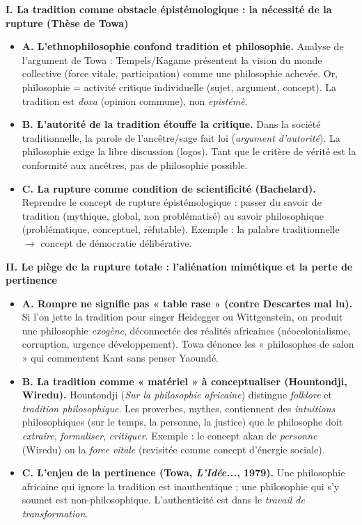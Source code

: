 \documentclass[11pt]{article}
\newcommand{\cle}[1]{{\popxbold\color{popdark}#1}}
\begin{document}
\begin{exoresolu}
\textbf{I. La tradition comme obstacle épistémologique : la nécessité de la rupture (Thèse de Towa)}
\begin{itemize}
    \item \textbf{A. L'ethnophilosophie confond tradition et philosophie.} Analyse de l'argument de Towa : Tempels/Kagame présentent la vision du monde collective (force vitale, participation) comme une philosophie achevée. Or, philosophie = \cle{activité critique individuelle} (sujet, argument, concept). La tradition est \emph{doxa} (opinion commune), non \emph{epistémè}.
    \item \textbf{B. L'autorité de la tradition étouffe la critique.} Dans la société traditionnelle, la parole de l'ancêtre/sage fait loi (\emph{argument d'autorité}). La philosophie exige la \cle{libre discussion} (logos). Tant que le critère de vérité est la conformité aux ancêtres, pas de philosophie possible.
    \item \textbf{C. La rupture comme condition de scientificité (Bachelard).} Reprendre le concept de \cle{rupture épistémologique} : passer du savoir de tradition (mythique, global, non problématisé) au savoir philosophique (problématique, conceptuel, réfutable). Exemple : la palabre traditionnelle $\rightarrow$ concept de démocratie délibérative.
\end{itemize}

\textbf{II. Le piège de la rupture totale : l'aliénation mimétique et la perte de pertinence}
\begin{itemize}
    \item \textbf{A. Rompre ne signifie pas « table rase » (contre Descartes mal lu).} Si l'on jette la tradition pour singer Heidegger ou Wittgenstein, on produit une philosophie \emph{exogène}, déconnectée des réalités africaines (néocolonialisme, corruption, urgence développement). Towa dénonce les « philosophes de salon » qui commentent Kant sans penser Yaoundé.
    \item \textbf{B. La tradition comme « matériel » à conceptualiser (Hountondji, Wiredu).} Hountondji (\emph{Sur la philosophie africaine}) distingue \emph{folklore} et \emph{tradition philosophique}. Les proverbes, mythes, contiennent des \emph{intuitions} philosophiques (sur le temps, la personne, la justice) que le philosophe doit \emph{extraire}, \emph{formaliser}, \emph{critiquer}. Exemple : le concept akan de \emph{personne} (Wiredu) ou la \emph{force vitale} (revisitée comme concept d'énergie sociale).
    \item \textbf{C. L'enjeu de la \cle{pertinence} (Towa, \emph{L'Idée...}, 1979).} Une philosophie africaine qui ignore la tradition est inauthentique ; une philosophie qui s'y soumet est non-philosophique. L'authenticité est dans le \emph{travail de transformation}.
\end{itemize}


\end{exoresolu}
\end{document}
